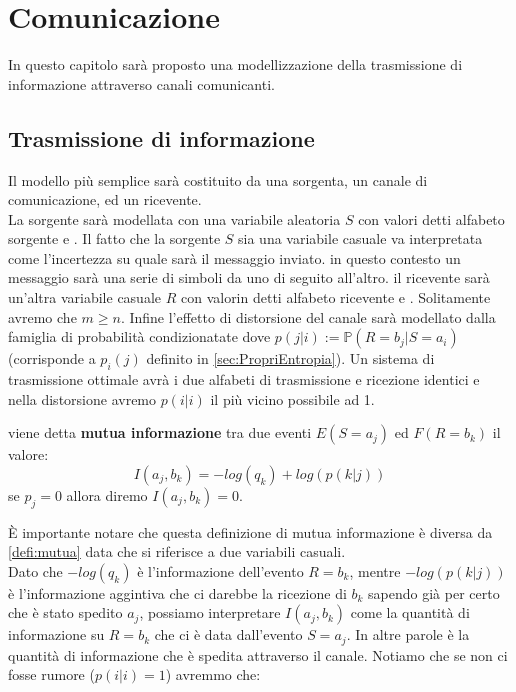 \chapter{Comunicazione}

In questo capitolo sarà proposto una modellizzazione della trasmissione di informazione attraverso canali comunicanti. 

\section{Trasmissione di informazione}
\label{sec:Trasmissione}

Il modello più semplice sarà costituito da una sorgenta, un canale di comunicazione, ed un ricevente.\\
La sorgente sarà modellata con una variabile aleatoria $S$ con valori \va detti alfabeto sorgente e \lep. Il fatto che la sorgente $S$ sia una variabile casuale va interpretata come l'incertezza su quale sarà il messaggio inviato. in questo contesto un messaggio sarà una serie di simboli da \va uno di seguito all'altro.
il ricevente sarà un'altra variabile casuale $R$ con valorin \vb  detti alfabeto ricevente e \leggeq. Solitamente avremo che $m \geq n$. Infine l'effetto di distorsione del canale sarà modellato dalla famiglia di probabilità condizionatate \lepc  dove $p(j|i):= \mathbb{P}(R=b_j|S=a_i)$ (corrisponde a $p_i(j)$ definito in \ref{sec:PropriEntropia}). Un sistema di trasmissione ottimale avrà i due alfabeti di trasmissione e ricezione identici e nella distorsione avremo $p(i|i)$ il più vicino possibile ad 1.\\
\begin{defi}
viene detta \textbf{mutua informazione}  tra due eventi $E(S=a_j)$ ed $F(R=b_k)$ il valore:
\begin{equation}
I(a_j,b_k)=-log(q_k)+ log(p(k|j))
\end{equation}
se $p_j=0$ allora diremo $I(a_j,b_k)=0$.
\end{defi}
È importante notare che questa definizione di mutua informazione è diversa da \ref{defi:mutua}  data che si riferisce a due variabili casuali.\\
Dato che $-log(q_k)$ è l'informazione dell'evento $R=b_k$, mentre $-log(p(k|j))$ è l'informazione aggintiva che ci darebbe la ricezione di $b_k$ sapendo già per certo che è stato spedito $a_j$, possiamo interpretare $I(a_j,b_k)$ come la quantità di informazione su $R=b_k$ che ci è data dall'evento $S=a_j$. In altre parole è la quantità di informazione che è spedita attraverso il canale. Notiamo che se non ci fosse rumore ($p(i|i)=1$) avremmo che:
